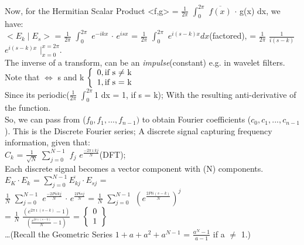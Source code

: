 \documentclass[a4paper, 10pt, onepage]{elegantbook}
\begin{document}
{Now, for the Hermitian Scalar Product <f,g> = $\frac{1}{2 \pi}$ $\int_0^{2 \pi}$ $\overline {f(x)}$ $\cdot$ g(x) dx, we have:  \\

$<E_k \mid E_s>$ =  $\frac{1}{2 \pi}$ $\int_0^{2 \pi}$ $e^{- ikx}$ $\cdot$ $e^{isx}$ = $\frac{1}{2 \pi}$ $\int_0^{2 \pi}$ $e^{i(s - k)x} dx$(factored),
= $\frac{1}{2 \pi}$ $\frac{1}{i(s - k)}$ $e^{i(s - k)x}$ $|_{x = 0}^{x = 2 \pi}$.  \\

The inverse of a transform, can be an \emph{impulse}(constant) e.g. in wavelet filters. \\

Note that $\iff$ s and k
$\left\{
\begin{array}{ll}
0,  \text{if s $\neq$ k} \\
1,  \text{if s = k}       \\
\end{array}              \\
\right.$  \\
    
Since its periodic($\frac{1}{2 \pi}$ $\int_0^{2 \pi}$1 dx = 1, if s = k); With the resulting anti-derivative of the function. \\

So, we can pass from ($f_0, f_1,...,f_{n-1})$ to obtain Fourier coefficients ($c_0,c_1,...,c_{n - 1}$). This is the Discrete Fourier series; A discrete signal capturing frequency information, given that:  \\
$C_k$ = $\frac{1}{\sqrt N}$ $\sum_{j = 0}^{N - 1}$ $f_j$ $e^{ \frac{-2 \pi \imath {kj}}{N}}$(DFT); \\

Each discrete signal becomes a vector component with (N) components.  \\

$E_K \cdot E_k$ = $\sum_{j=0}^{N-1} \overline{E_{kj}} \cdot E_{sj}$ = \\

$\frac{1}{N}$ $\sum_{j=0}^{N-1}$ $e^\frac{-2 Pi i kj}{N}$ $\cdot$ $e^\frac{2 Pi sj}{N}$ = $\frac{1}{N}$ $\sum_{j=0}^{N-1}$ $\left(e^\frac{2 Pi i(s-k)}{N} \right)^j$ \\

= $\frac{1}{N}$ $\frac{\left(e^{2 \pi \imath(s-k)} - 1 \right)}{\left(\frac{e^{2 \pi \imath(s-k)}}{N} - 1 \right)}$ =
$\left\{
\begin{array}{ll}
0 \\
1  \\
\end{array}  \\
\right\}$  \\
\ldots (Recall the Geometric Series $1 + a + a^2 +a^{N-1}$ = $\frac{a^{N} - 1}{a - 1}$ if a $\neq$ 1.) \\

}
\end{document}
